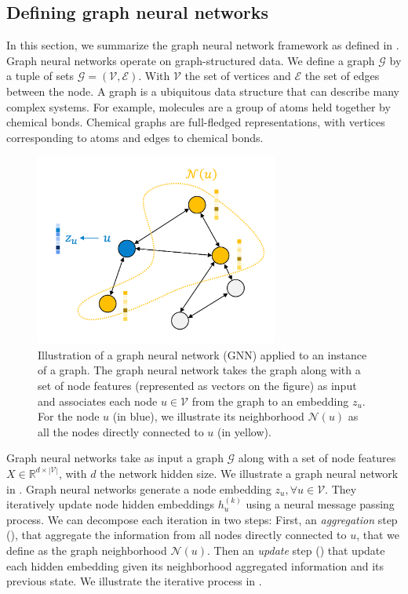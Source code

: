 \subsection{Defining graph neural networks}

In this section, we summarize the graph neural network framework as defined in \textcite{hamilton_2020}.
Graph neural networks operate on graph-structured data. We define a graph $\mathscr{G}$ by a tuple of sets $\mathscr{G} = (\mathcal{V}, \mathcal{E})$. With $\mathcal{V}$ the set of vertices and $\mathcal{E}$ the set of edges between the node. 
A graph is a ubiquitous data structure that can describe many complex systems. For example, molecules are a group of atoms held together by chemical bonds. Chemical graphs are full-fledged representations, with vertices corresponding to atoms and edges to chemical bonds.

\begin{figure}[!htb]
\begin{center}
\includegraphics[width=8cm]{images/graph-neihborhood_2.png}
\end{center}
\caption{Illustration of a graph neural network (GNN) applied to an instance of a graph. The graph neural network takes the graph along with a set of node features (represented as vectors on the figure) as input and associates each node $u \in \mathcal{V}$ from the graph to an embedding $z_u$. For the node $u$ (in blue), we illustrate its neighborhood $\mathcal{N}(u)$  as all the nodes directly connected to $u$ (in yellow).}
\end{figure}

Graph neural networks take as input a graph $\mathscr{G}$ along with a set of node features $X \in \mathbb{R}^{d \times |\mathcal{V}|}$, with $d$ the network hidden size. We illustrate a graph neural network in .
Graph neural networks generate a node embedding $z_u, \forall u \in \mathcal{V}$. They iteratively update node hidden embeddings $h_u^{(k)}$ using a neural message passing process. 
We can decompose each iteration in two steps: First, an \textit{aggregation} step (), that aggregate the information from all nodes directly connected to $u$, that we define as the graph neighborhood $\mathcal{N}(u)$. Then an \textit{update} step () that update each hidden embedding given its neighborhood aggregated information and its previous state. We illustrate the iterative process in . 

